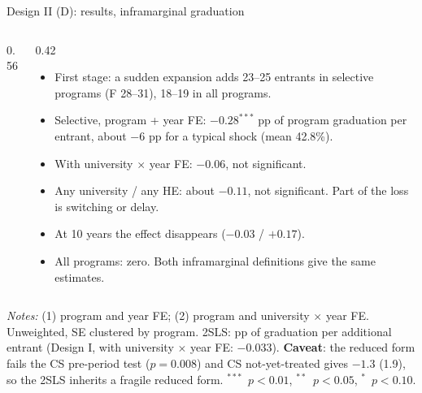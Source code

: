 \documentclass{beamer}
\newcommand{\sym}[1]{\ensuremath{^{#1}}}
\begin{document}
\begin{frame}{Design II (D): results, inframarginal graduation}
\begin{columns}[T,onlytextwidth]
\begin{column}{0.56\textwidth}
\centering
\tiny
\resizebox{\linewidth}{!}{}
\end{column}
\begin{column}{0.42\textwidth}
\scriptsize
\begin{itemize}
    \setlength{\itemsep}{3pt}
    \item First stage: a sudden expansion adds 23--25 entrants in selective programs (F 28--31), 18--19 in all programs.
    \item Selective, program + year FE: $-0.28^{***}$ pp of program graduation per entrant, about $-6$ pp for a typical shock (mean 42.8\%).
    \item With university $\times$ year FE: $-0.06$, not significant.
    \item Any university / any HE: about $-0.11$, not significant. Part of the loss is switching or delay.
    \item At 10 years the effect disappears ($-0.03$ / $+0.17$).
    \item All programs: zero. Both inframarginal definitions give the same estimates.
\end{itemize}
\end{column}
\end{columns}

\vspace{0.06cm}
\parbox{0.97\textwidth}{\tiny \textit{Notes:} (1) program and year FE; (2) program and university $\times$ year FE. Unweighted, SE clustered by program.
2SLS: pp of graduation per additional entrant (Design I, with university $\times$ year FE: $-0.033$). \textbf{Caveat}: the reduced form fails the CS pre-period test
($p=0.008$) and CS not-yet-treated gives $-1.3$ (1.9), so the 2SLS inherits a fragile reduced form.
\sym{***}~$p<0.01$, \sym{**}~$p<0.05$, \sym{*}~$p<0.10$.}
\end{frame}
\end{document}
